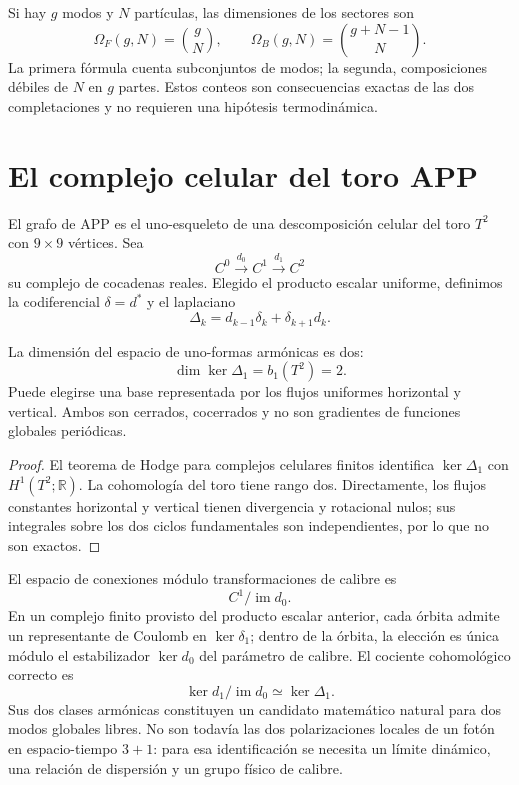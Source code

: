 Si hay \(g\) modos y \(N\) partículas, las dimensiones de los sectores son
\[
 \Omega_F(g,N)=\binom gN,
 \qquad
 \Omega_B(g,N)=\binom{g+N-1}{N}.
\]
La primera fórmula cuenta subconjuntos de modos; la segunda, composiciones
débiles de \(N\) en \(g\) partes. Estos conteos son consecuencias exactas de
las dos completaciones y no requieren una hipótesis termodinámica.

\section{El complejo celular del toro APP}

El grafo de APP es el uno-esqueleto de una descomposición celular del toro
\(T^2\) con \(9\times9\) vértices. Sea
\[
 C^0\xrightarrow{d_0}C^1\xrightarrow{d_1}C^2
\]
su complejo de cocadenas reales. Elegido el producto escalar uniforme,
definimos la codiferencial \(\delta=d^*\) y el laplaciano
\[
 \Delta_k=d_{k-1}\delta_k+\delta_{k+1}d_k.
\]

\begin{theorem}
La dimensión del espacio de uno-formas armónicas es dos:
\[
 \dim\ker\Delta_1=b_1(T^2)=2.
\]
Puede elegirse una base representada por los flujos uniformes horizontal y
vertical. Ambos son cerrados, cocerrados y no son gradientes de funciones
globales periódicas.
\end{theorem}

\begin{proof}
El teorema de Hodge para complejos celulares finitos identifica
\(\ker\Delta_1\) con \(H^1(T^2;\mathbb R)\). La cohomología del toro tiene
rango dos. Directamente, los flujos constantes horizontal y vertical tienen
divergencia y rotacional nulos; sus integrales sobre los dos ciclos
fundamentales son independientes, por lo que no son exactos.
\end{proof}

El espacio de conexiones módulo transformaciones de calibre es
\[
 C^1/\operatorname{im}d_0.
\]
En un complejo finito provisto del producto escalar anterior, cada órbita
admite un representante de Coulomb en \(\ker\delta_1\); dentro de la órbita,
la elección es única módulo el estabilizador \(\ker d_0\) del parámetro de
calibre. El cociente cohomológico correcto es
\[
 \ker d_1/\operatorname{im}d_0
 \simeq \ker\Delta_1 .
\]
Sus dos clases armónicas constituyen un candidato matemático natural para
dos modos globales libres. No son todavía las dos polarizaciones locales de
un fotón en espacio-tiempo \(3+1\): para esa identificación se necesita un
límite dinámico, una relación de dispersión y un grupo físico de calibre.

